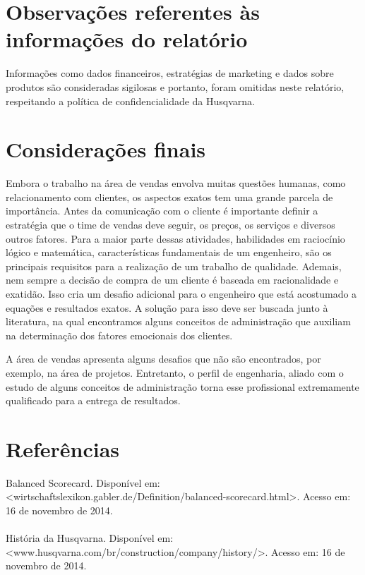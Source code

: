 \documentclass[12pt]{article}
\begin{document}
\pagebreak

\section{Observações referentes às informações do relatório
}
	Informações como dados financeiros, estratégias de marketing e dados sobre produtos são consideradas sigilosas e portanto, foram omitidas neste relatório, respeitando a política de confidencialidade da Husqvarna.
\pagebreak

\section{Considerações finais}
	
	Embora o trabalho na área de vendas envolva muitas questões humanas, como relacionamento com clientes, os aspectos exatos tem uma grande parcela de importância. Antes da comunicação com o cliente é importante definir a estratégia que o time de vendas deve seguir, os preços, os serviços e diversos outros fatores. Para a maior parte dessas atividades, habilidades em raciocínio lógico e matemática, características fundamentais de um engenheiro, são os principais requisitos para a realização de um trabalho de qualidade. Ademais, nem sempre a decisão de compra de um cliente é baseada em racionalidade e exatidão. Isso cria um desafio adicional para o engenheiro que está acostumado a equações e resultados exatos. A solução para isso deve ser buscada junto à literatura, na qual encontramos alguns conceitos de administração que auxiliam na determinação dos fatores emocionais dos clientes.
	
	A área de vendas apresenta alguns desafios que não são encontrados, por exemplo, na área de projetos. Entretanto, o perfil de engenharia, aliado com o estudo de alguns conceitos de administração torna esse profissional extremamente qualificado para a entrega de resultados.
\pagebreak

\section{Referências}
	{
		\noindent
		Balanced Scorecard. Disponível em: <wirtschaftslexikon.gabler.de/Definition/balanced-scorecard.html>. Acesso em: 16 de novembro de 2014. \\
		\\
		História da Husqvarna. Disponível em: <www.husqvarna.com/br/construction/company/history/>. Acesso em: 16 de novembro de 2014. \\
	}
\pagebreak
\end{document}
